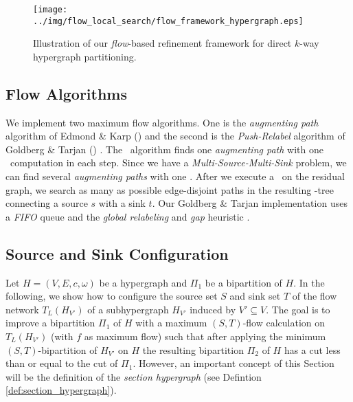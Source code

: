 \begin{figure}
\centering 
\texttt{[image: ../img/flow\_local\_search/flow\_framework\_hypergraph.eps]}
\caption{Illustration of our \emph{flow}-based refinement framework for direct $k$-way hypergraph
         partitioning.}
\label{img:flow_framework}
\end{figure} 

\subsection{Flow Algorithms}
\label{sec:flow_algo_implementation}

We implement two maximum flow algorithms.
One is the \emph{augmenting path} algorithm of Edmond \& Karp (\EdmondKarp)
\cite{edmonds1972theoretical} 
and the second is the \emph{Push-Relabel} algorithm of
Goldberg \& Tarjan (\GoldbergTarjan) \cite{cherkassky1997implementing,goldberg1988new}. 
The \EdmondKarp~algorithm finds one \emph{augmenting path} with one \BFS~computation in each step.
Since we have a \emph{Multi-Source-Multi-Sink} problem, we can find several \emph{augmenting paths}
with one \BFS. After we execute a \BFS~on the residual graph, we search 
as many as possible edge-disjoint paths in the resulting \BFS-tree connecting a source $s$
with a sink $t$. Our Goldberg \& Tarjan implementation uses a \emph{FIFO} queue and
the \emph{global relabeling} and \emph{gap} heuristic \cite{cherkassky1997implementing}.


\subsection{Source and Sink Configuration}
\label{sec:source_and_sink}

Let $H = (V,E,c,\omega)$ be a hypergraph and $\Pi_1$ be a bipartition of $H$.
In the following, we show how to configure the source set $S$ and sink set $T$ of the flow
network $T_L(H_{V'})$ of a subhypergraph $H_{V'}$ induced by $V' \subseteq V$. The goal is 
to improve a bipartition $\Pi_1$ of $H$ with a maximum $(S,T)$-flow calculation 
on $T_L(H_{V'})$ (with $f$ as maximum flow) such that after applying the minimum 
$(S,T)$-bipartition of $H_{V'}$ on $H$ the resulting bipartition $\Pi_2$ of $H$ has a 
cut less than or equal to the cut of $\Pi_1$. However, an important concept of this Section will
be the definition of the \emph{section hypergraph} (see Defintion
\ref{def:section_hypergraph}). 

